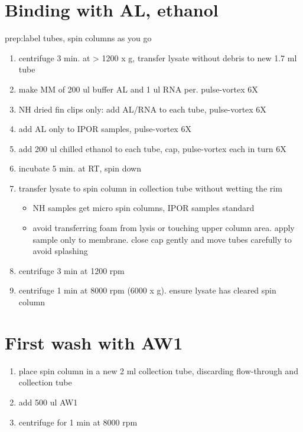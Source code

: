 \documentclass{article}
\begin{document}
\pagebreak

\section*{Binding with AL, ethanol}
prep:label tubes, spin columns as you go
\begin{enumerate}
    \item centrifuge 3 min. at > 1200 x g, transfer lysate without debris to new 1.7 ml tube
    \item make MM of 200 ul buffer AL and 1 ul RNA per. pulse-vortex 6X
    \item NH dried fin clips only: add AL/RNA to each tube, pulse-vortex 6X
    \item add AL only to IPOR samples, pulse-vortex 6X
    \item add 200 ul chilled ethanol to each tube, cap, pulse-vortex each in turn 6X
    \item incubate 5 min. at RT, spin down
    \item transfer lysate to spin column in collection tube without wetting the rim
    \begin{itemize}
        \item NH samples get micro spin columns, IPOR samples standard
        \item avoid transferring foam from lysis or touching upper column area. apply sample only to membrane. close cap gently and move tubes carefully to avoid splashing
    \end{itemize}
    \item centrifuge 3 min at 1200 rpm
    \item centrifuge 1 min at 8000 rpm (6000 x g). ensure lysate has cleared spin column
\end{enumerate}

\section*{First wash with AW1}
\begin{enumerate}
    \item place spin column in a new 2 ml collection tube, discarding flow-through and collection tube
    \item add 500 ul AW1  
    \item centrifuge for 1 min at 8000 rpm
\end{enumerate}
\end{document}
